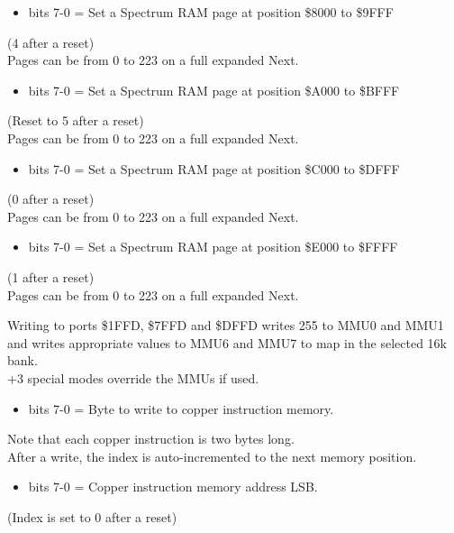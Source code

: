 \begin{itemize}
\item bits 7-0 = Set a Spectrum RAM page at position \$8000 to \$9FFF
\end{itemize}
(4 after a reset)\\
Pages can be from 0 to 223 on a full expanded Next.

\begin{itemize}
\item bits 7-0 = Set a Spectrum RAM page at position \$A000 to \$BFFF
\end{itemize}
(Reset to 5 after a reset)\\
Pages can be from 0 to 223 on a full expanded Next.

\begin{itemize}
\item bits 7-0 = Set a Spectrum RAM page at position \$C000 to \$DFFF
\end{itemize}
(0 after a reset)\\
Pages can be from 0 to 223 on a full expanded Next.

\begin{itemize}
\item bits 7-0 = Set a Spectrum RAM page at position \$E000 to \$FFFF
\end{itemize}
(1 after a reset)\\
Pages can be from 0 to 223 on a full expanded Next.

Writing to ports \$1FFD, \$7FFD and \$DFFD writes 255 to MMU0 and MMU1
and writes appropriate values to MMU6 and MMU7 to map in the selected
16k bank.\\
+3 special modes override the MMUs if used.

\begin{itemize}
\item bits 7-0 = Byte to write to copper instruction memory.
\end{itemize}
Note that each copper instruction is two bytes long.\\
After a write, the index is auto-incremented to the next memory position.

\begin{itemize}
\item bits 7-0 = Copper instruction memory address LSB.
\end{itemize}
(Index is set to 0 after a reset)

